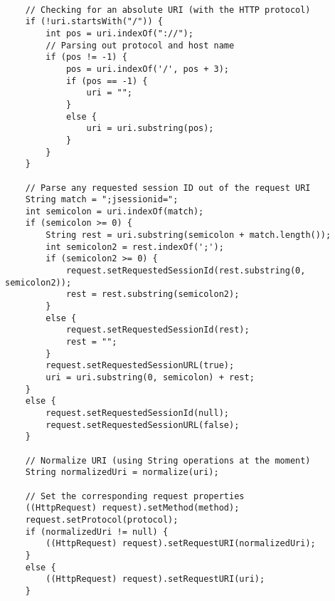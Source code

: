\begin{enumerate}
\begin{lstlisting}
	
	// Checking for an absolute URI (with the HTTP protocol)
	if (!uri.startsWith("/")) {
		int pos = uri.indexOf("://");
		// Parsing out protocol and host name
		if (pos != -1) {
			pos = uri.indexOf('/', pos + 3);
			if (pos == -1) {
				uri = "";
			}
			else {
				uri = uri.substring(pos);
			}
		}
	}
	
	// Parse any requested session ID out of the request URI
	String match = ";jsessionid=";
	int semicolon = uri.indexOf(match);
	if (semicolon >= 0) {
		String rest = uri.substring(semicolon + match.length());
		int semicolon2 = rest.indexOf(';');
		if (semicolon2 >= 0) {
			request.setRequestedSessionId(rest.substring(0, semicolon2));
			rest = rest.substring(semicolon2);
		}
		else {
			request.setRequestedSessionId(rest);
			rest = "";
		}
		request.setRequestedSessionURL(true);
		uri = uri.substring(0, semicolon) + rest;
	}
	else {
		request.setRequestedSessionId(null);
		request.setRequestedSessionURL(false);
	}
	
	// Normalize URI (using String operations at the moment)
	String normalizedUri = normalize(uri);
	
	// Set the corresponding request properties
	((HttpRequest) request).setMethod(method);
	request.setProtocol(protocol);
	if (normalizedUri != null) {
		((HttpRequest) request).setRequestURI(normalizedUri);
	}
	else {
		((HttpRequest) request).setRequestURI(uri);
	}
	

\end{lstlisting}
\end{enumerate}
